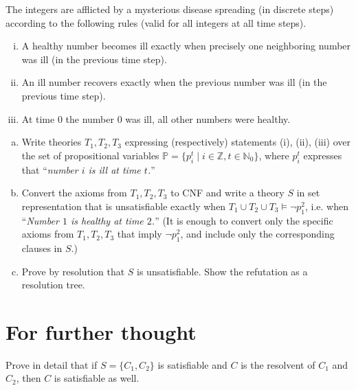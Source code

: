 \begin{problem}

    The integers are afflicted by a mysterious disease spreading (in discrete steps) according to the following rules (valid for all integers at all time steps).
    \begin{enumerate}[(i)]\it
        \item A healthy number becomes ill exactly when precisely one neighboring number was ill (in the previous time step).
        \item An ill number recovers exactly when the previous number was ill (in the previous time step).
        \item At time $0$ the number $0$ was ill, all other numbers were healthy.
    \end{enumerate}
    \begin{enumerate}[(a)]
        \item Write theories $T_1, T_2, T_3$ expressing (respectively) statements (i), (ii), (iii) over the set of propositional variables $\mathbb{P}=\{p_i^t \mid i\in\mathbb{Z}, t\in\mathbb{N}_0\}$, where $p_i^t$ expresses that ``{\it number $i$ is ill at time $t$.}'' 
        \item Convert the axioms from $T_1, T_2, T_3$ to CNF and write a theory $S$ in set representation that is unsatisfiable exactly when $T_1 \cup T_2 \cup T_3 \models \neg p_1^2$, i.e. when ``{\it Number $1$ is healthy at time $2$.}'' (It is enough to convert only the specific axioms from $T_1,T_2,T_3$ that imply $\neg p_1^2$, and include only the corresponding clauses in $S$.)
        \item Prove by resolution that $S$ is unsatisfiable. Show the refutation as a resolution tree.
    \end{enumerate}

\end{problem}


        
\section*{For further thought}


\begin{problem}
    Prove in detail that if $S=\{C_1,C_2\}$ is satisfiable and $C$ is the resolvent of $C_1$ and $C_2$, then $C$ is satisfiable as well.
\end{problem}

